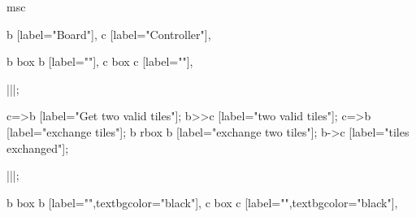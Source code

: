 \begin{msc}
msc
{

b [label="Board"],
c [label="Controller"],

b box b [label=""],
c box c [label=""],

|||;

c=>b [label="Get two valid tiles"];
b>>c [label="two valid tiles"];
c=>b [label="exchange tiles"];
b rbox b [label="exchange two tiles"];
b->c [label="tiles exchanged"];

|||;

b box b [label="",textbgcolor="black"],
c box c [label="",textbgcolor="black"],

}
\end{msc}

